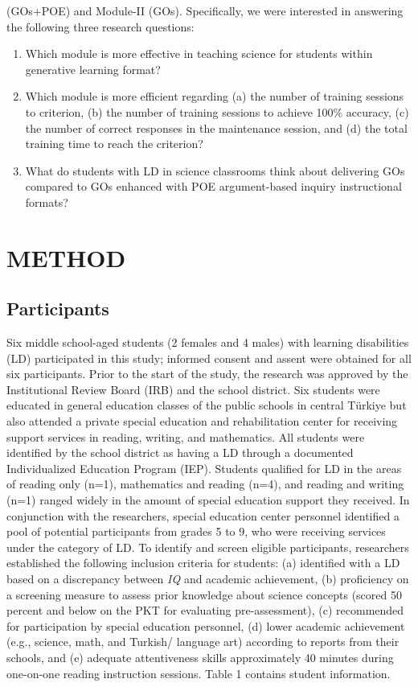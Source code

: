 \documentclass[11.5pt]{sig-alternate} %
\begin{document}
\begin{large}
(GOs+POE) and Module-II (GOs). Specifically, we were interested in answering the following three research questions: 

\begin{enumerate}
    \item Which module is more effective in teaching science for students within generative learning format? 
    \item Which module is more efficient regarding (a) the number of training sessions to criterion, (b) the number of training sessions to achieve 100\% accuracy, (c) the number of correct responses in the maintenance session, and (d) the total training time to reach the criterion? 
    \item What do students with LD in science classrooms think about delivering GOs compared to GOs enhanced with POE argument-based inquiry instructional formats?
\end{enumerate}

\section*{METHOD}
\subsection*{Participants}
Six middle school-aged students (2 females and 4 males) with learning disabilities (LD) participated in this study; informed consent and assent were obtained for all six participants. Prior to the start of the study, the research was approved by the Institutional Review Board (IRB) and the school district. Six students were educated in general education classes of the public schools in central Türkiye but also attended a private special education and rehabilitation center for receiving support services in reading, writing, and mathematics. All students were identified by the school district as having a LD through a documented Individualized Education Program (IEP). Students qualified for LD in the areas of reading only (n=1), mathematics and reading (n=4), and reading and writing (n=1) ranged widely in the amount of special education support they received. In conjunction with the researchers, special education center personnel identified a pool of potential participants from grades 5 to 9, who were receiving services under the category of LD. To identify and screen eligible participants, researchers established the following inclusion criteria for students: (a) identified with a LD based on a discrepancy between \textit{IQ} and academic achievement, (b) proficiency on a screening measure to assess prior knowledge about science concepts (scored 50 percent and below on the PKT for evaluating pre-assessment), (c) recommended for participation by special education personnel, (d) lower academic achievement (e.g., science, math, and Turkish/ language art) according to reports from their schools, and (e) adequate attentiveness skills approximately 40 minutes during one-on-one reading instruction sessions. Table 1 contains student information.


\end{large}
\end{document}
